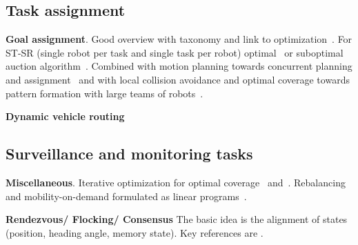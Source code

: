 
\subsection{Task assignment}

\textbf{Goal assignment}.
Good overview with taxonomy and link to optimization~\cite{Gerkey:2004il}. For ST-SR (single robot per task and single task per robot) optimal~\cite{kuhn55} or suboptimal auction algorithm~\cite{Bertsekas:1992wx}.
Combined with motion planning towards concurrent planning and assignment~\cite{Turpin:2014bu} and with local collision avoidance and optimal coverage towards pattern formation with large teams of robots~\cite{alonsomora12ijrr}.

\textbf{Dynamic vehicle routing} \cite{Bullo.Frazzoli.ea:PIEEE10}

\subsection{Surveillance and monitoring tasks}


\textbf{Miscellaneous}. 
Iterative optimization for optimal coverage~\cite{cortes04} and~\cite{Schwager:2009fz}. Rebalancing and mobility-on-demand formulated as linear programs~\cite{Smith:2013fa}.

\textbf{Rendezvous/ Flocking/ Consensus} The basic idea is the alignment of states (position, heading angle, memory state). Key references are \cite{Cortes.Martinez.ea:06,Jadbabaie.Lin.ea:03}.

